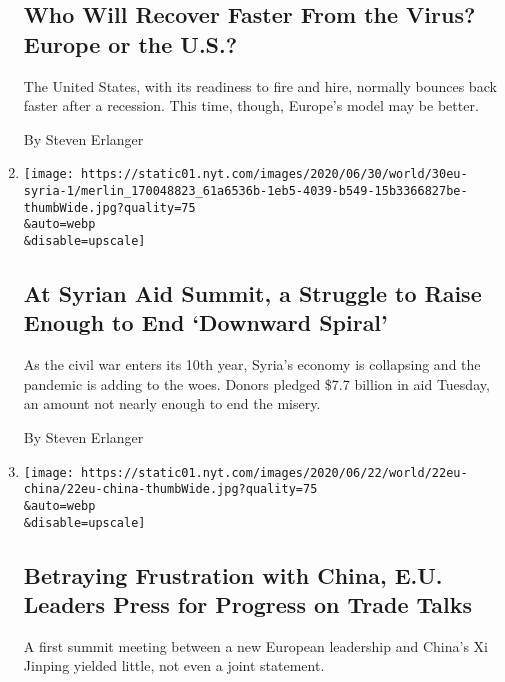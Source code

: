 \begin{enumerate}
  \hypertarget{who-will-recover-faster-from-the-virus-europe-or-the-us}{%
  \subsection{Who Will Recover Faster From the Virus? Europe or the
  U.S.?}\label{who-will-recover-faster-from-the-virus-europe-or-the-us}}

  The United States, with its readiness to fire and hire, normally
  bounces back faster after a recession. This time, though, Europe's
  model may be better.

  By Steven Erlanger
\item
  \href{/2020/06/30/world/europe/syria-aid-refugees-united-nations.html}{}

  \texttt{[image: https://static01.nyt.com/images/2020/06/30/world/30eu-syria-1/merlin\_170048823\_61a6536b-1eb5-4039-b549-15b3366827be-thumbWide.jpg?quality=75\\\&auto=webp\\\&disable=upscale]}

  \hypertarget{at-syrian-aid-summit-a-struggle-to-raise-enough-to-end-downward-spiral}{%
  \subsection{At Syrian Aid Summit, a Struggle to Raise Enough to End
  `Downward
  Spiral'}\label{at-syrian-aid-summit-a-struggle-to-raise-enough-to-end-downward-spiral}}

  As the civil war enters its 10th year, Syria's economy is collapsing
  and the pandemic is adding to the woes. Donors pledged \$7.7 billion
  in aid Tuesday, an amount not nearly enough to end the misery.

  By Steven Erlanger
\item
  \href{/2020/06/22/world/europe/china-eu-trade-talks.html}{}

  \texttt{[image: https://static01.nyt.com/images/2020/06/22/world/22eu-china/22eu-china-thumbWide.jpg?quality=75\\\&auto=webp\\\&disable=upscale]}

  \hypertarget{betraying-frustration-with-china-eu-leaders-press-for-progress-on-trade-talks}{%
  \subsection{Betraying Frustration with China, E.U. Leaders Press for
  Progress on Trade
  Talks}\label{betraying-frustration-with-china-eu-leaders-press-for-progress-on-trade-talks}}

  A first summit meeting between a new European leadership and China's
  Xi Jinping yielded little, not even a joint statement.


\end{enumerate}
